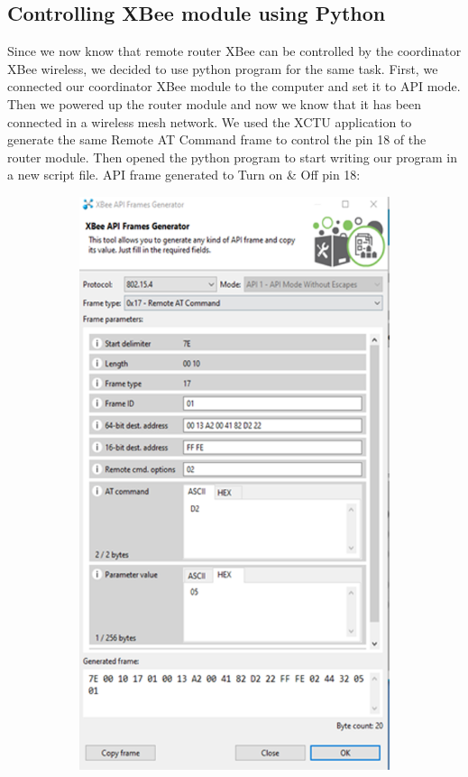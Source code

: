 	\subsection{Controlling XBee module using Python}
	\par Since we now know that remote router XBee can be controlled by the coordinator XBee wireless, we decided to use python program for the same task. First, we connected our coordinator XBee module to the computer and set it to API mode. Then we powered up the router module and now we know that it has been connected in a wireless mesh network. We used the XCTU application to generate the same Remote AT Command frame to control the pin 18 of the router module. Then opened the python program to start writing our program in a new script file. API frame generated to Turn on \& Off pin 18: 
	\begin{figure}[h!]
		\centering
		\begin{subfigure}[t]{0.22\textwidth}
			\centering
			\includegraphics[width=\textwidth]{xctuFrames1.png}

\end{subfigure}
\end{figure}
